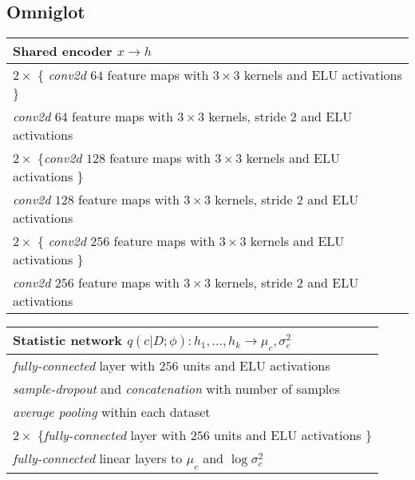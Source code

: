 \documentclass{article} \usepackage{iclr2017_conference,times}
\begin{document}
\subsection{Omniglot}
\label{appendixb:omniglot}
\begin{table}[H]

    \begin{tabular}{  l}
    \bf{Shared encoder} $x \to h$ \\ \hline
    $2 \times$ \{ \emph{conv2d} $64$ feature maps with $3 \times 3$ kernels and ELU activations \} \\
    \emph{conv2d} $64$ feature maps with $3 \times 3$ kernels, stride $2$ and ELU activations \\
    
    $2 \times$ \{\emph{conv2d} $128$ feature maps with $3 \times 3$ kernels and ELU activations \} \\
    \emph{conv2d} $128$ feature maps with $3 \times 3$ kernels, stride $2$ and ELU activations  \\
    
    $2 \times$ \{ \emph{conv2d} $256$ feature maps with $3 \times 3$ kernels and ELU activations \} \\
    \emph{conv2d} $256$ feature maps with $3 \times 3$ kernels, stride $2$ and ELU activations
\label{table:omniglot_common_encoder}
    \end{tabular}
\end{table}
\begin{table}[H]

    \begin{tabular}{  l}
    \bf{Statistic network} $q(c | D;  \phi): h_1, \dots, h_k \to \mu_c, \sigma^2_c$ \\ \hline
    \emph{fully-connected} layer with $256$ units and ELU activations \\
    \emph{sample-dropout} and \emph{concatenation} with number of samples \\
    \emph{average pooling} within each dataset\\
    $2 \times$ \{\emph{fully-connected} layer with $256$ units and ELU activations \} \\
    \emph{fully-connected} linear layers to $\mu_c$ and $\log \sigma^2_c$
\label{table:omniglot_statistic_network}
    \end{tabular}
\end{table}
\end{document}

